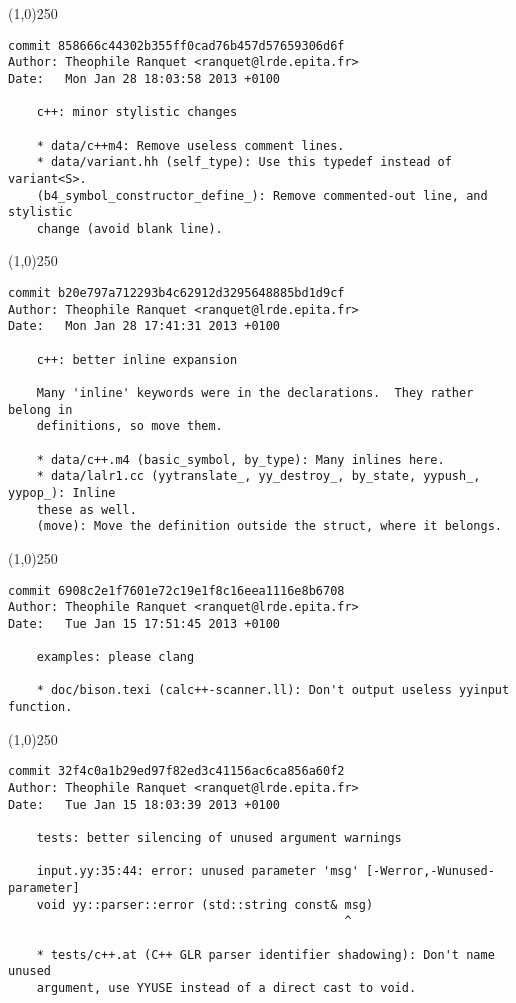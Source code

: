 \line(1,0){250}
\begin{verbatim}
commit 858666c44302b355ff0cad76b457d57659306d6f
Author: Theophile Ranquet <ranquet@lrde.epita.fr>
Date:   Mon Jan 28 18:03:58 2013 +0100

    c++: minor stylistic changes
    
    * data/c++m4: Remove useless comment lines.
    * data/variant.hh (self_type): Use this typedef instead of variant<S>.
    (b4_symbol_constructor_define_): Remove commented-out line, and stylistic
    change (avoid blank line).

\end{verbatim}
\line(1,0){250}
\begin{verbatim}
commit b20e797a712293b4c62912d3295648885bd1d9cf
Author: Theophile Ranquet <ranquet@lrde.epita.fr>
Date:   Mon Jan 28 17:41:31 2013 +0100

    c++: better inline expansion
    
    Many 'inline' keywords were in the declarations.  They rather belong in
    definitions, so move them.
    
    * data/c++.m4 (basic_symbol, by_type): Many inlines here.
    * data/lalr1.cc (yytranslate_, yy_destroy_, by_state, yypush_, yypop_): Inline
    these as well.
    (move): Move the definition outside the struct, where it belongs.

\end{verbatim}
\line(1,0){250}
\begin{verbatim}
commit 6908c2e1f7601e72c19e1f8c16eea1116e8b6708
Author: Theophile Ranquet <ranquet@lrde.epita.fr>
Date:   Tue Jan 15 17:51:45 2013 +0100

    examples: please clang
    
    * doc/bison.texi (calc++-scanner.ll): Don't output useless yyinput function.

\end{verbatim}
\line(1,0){250}
\begin{verbatim}
commit 32f4c0a1b29ed97f82ed3c41156ac6ca856a60f2
Author: Theophile Ranquet <ranquet@lrde.epita.fr>
Date:   Tue Jan 15 18:03:39 2013 +0100

    tests: better silencing of unused argument warnings
    
    input.yy:35:44: error: unused parameter 'msg' [-Werror,-Wunused-parameter]
    void yy::parser::error (std::string const& msg)
                                               ^
    
    * tests/c++.at (C++ GLR parser identifier shadowing): Don't name unused
    argument, use YYUSE instead of a direct cast to void.

\end{verbatim}
